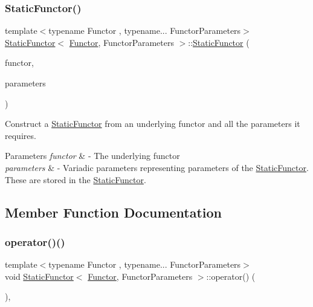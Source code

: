 \subsubsection{\texorpdfstring{Static\+Functor()}{StaticFunctor()}}
{\footnotesize\ttfamily template$<$typename Functor , typename... Functor\+Parameters$>$ \\
\mbox{\hyperlink{class_static_functor}{Static\+Functor}}$<$ \mbox{\hyperlink{class_functor}{Functor}}, Functor\+Parameters $>$\+::\mbox{\hyperlink{class_static_functor}{Static\+Functor}} (\begin{DoxyParamCaption}\item[{\mbox{\hyperlink{class_functor}{Functor}} \&\&}]{functor,  }\item[{Functor\+Parameters \&\&...}]{parameters }\end{DoxyParamCaption})}

Construct a \mbox{\hyperlink{class_static_functor}{Static\+Functor}} from an underlying functor and all the parameters it requires. 
\begin{DoxyParams}{Parameters}
{\em functor} & -\/ The underlying functor \\
\hline
{\em parameters} & -\/ Variadic parameters representing parameters of the \mbox{\hyperlink{class_static_functor}{Static\+Functor}}. These are stored in the \mbox{\hyperlink{class_static_functor}{Static\+Functor}}. \\
\hline
\end{DoxyParams}


\subsection{Member Function Documentation}
\mbox{\label{class_static_functor_a1d8fe0ec2f9965c5f95ad182a8df510b}} 
\subsubsection{\texorpdfstring{operator()()}{operator()()}}
{\footnotesize\ttfamily template$<$typename Functor , typename... Functor\+Parameters$>$ \\
void \mbox{\hyperlink{class_static_functor}{Static\+Functor}}$<$ \mbox{\hyperlink{class_functor}{Functor}}, Functor\+Parameters $>$\+::operator() (\begin{DoxyParamCaption}{ }\end{DoxyParamCaption})\hspace{0.3cm}{\ttfamily [override]}, {\ttfamily [virtual]}}

